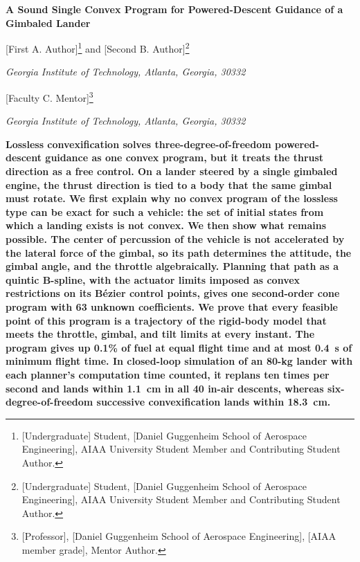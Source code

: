 \documentclass[10pt,letterpaper]{article}
\newenvironment{aiaaabstract}{\begin{list}{}{\setlength{\leftmargin}{0.5in}\setlength{\rightmargin}{0.5in}%
  \setlength{\listparindent}{0.2in}\setlength{\itemindent}{0.2in}\setlength{\topsep}{10pt}}\item\bfseries}{\end{list}}
\theoremstyle{aiaa}
\begin{document}
\begin{center}
{\fontsize{24}{28}\selectfont\bfseries A Sound Single Convex Program for Powered-Descent Guidance of a Gimbaled Lander\par}
\vspace{14pt}
{\large [First A. Author]\footnote{[Undergraduate] Student, [Daniel Guggenheim School of Aerospace Engineering], AIAA University Student
Member and Contributing Student Author.} and [Second B. Author]\footnote{[Undergraduate] Student, [Daniel Guggenheim School of
Aerospace Engineering], AIAA University Student Member and Contributing Student Author.}\par}
{\large\itshape Georgia Institute of Technology, Atlanta, Georgia, 30332\par}
\vspace{10pt}
{\large [Faculty C. Mentor]\footnote{[Professor], [Daniel Guggenheim School of Aerospace Engineering], [AIAA member grade], Mentor Author.}\par}
{\large\itshape Georgia Institute of Technology, Atlanta, Georgia, 30332\par}
\end{center}

\begin{aiaaabstract}
Lossless convexification solves three-degree-of-freedom powered-descent guidance as one convex program, but it treats the
thrust direction as a free control. On a lander steered by a single gimbaled engine, the thrust direction is tied to a body
that the same gimbal must rotate. We first explain why no convex program of the lossless type can be exact for such a vehicle:
the set of initial states from which a landing exists is not convex. We then show what remains possible. The center of
percussion of the vehicle is not accelerated by the lateral force of the gimbal, so its path determines the attitude, the
gimbal angle, and the throttle algebraically. Planning that path as a quintic B-spline, with the actuator limits imposed as
convex restrictions on its B\'ezier control points, gives one second-order cone program with 63 unknown coefficients. We prove
that every feasible point of this program is a trajectory of the rigid-body model that meets the throttle, gimbal, and tilt
limits at every instant. The program gives up 0.1\% of fuel at equal flight time and at most 0.4~s of minimum flight time.
In closed-loop simulation of an 80-kg lander with each planner's computation time counted, it replans ten times per second and
lands within 1.1~cm in all 40 in-air descents, whereas six-degree-of-freedom successive convexification lands within 18.3~cm.
\end{aiaaabstract}
\end{document}
